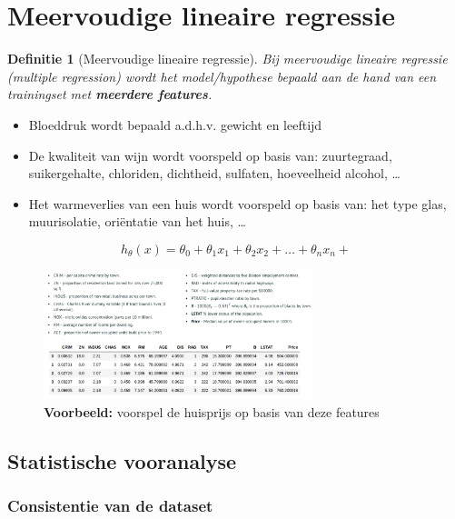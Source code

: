\documentclass{article}
\newtheorem{theorem}{Definitie}[section]
\begin{document}
\section{Meervoudige lineaire regressie}

\begin{theorem}[Meervoudige lineaire regressie]
Bij meervoudige lineaire regressie (multiple regression) wordt het model/hypothese bepaald 
aan de hand van een trainingset met \textbf{meerdere features}.
\end{theorem}

\begin{itemize}
    \item Bloeddruk wordt bepaald a.d.h.v. gewicht en leeftijd
    \item De kwaliteit van wijn wordt voorspeld op basis van: zuurtegraad, suikergehalte, chloriden, dichtheid, sulfaten, hoeveelheid alcohol, \dots
    \item Het warmeverlies van een huis wordt voorspeld op basis van: het type glas, muurisolatie, oriëntatie van het huis, \dots
\end{itemize}

\begin{equation}
h_{\theta}(x) = \theta_0 + \theta_1x_1 + \theta_2x_2 + \dots + \theta_nx_n + 
\end{equation}

\begin{figure}[H]
    \centering
    \includegraphics[width=0.7\textwidth]{multiple-regression-voorbeeld.png}
    \caption{\textbf{Voorbeeld:} voorspel de huisprijs op basis van deze features }
\end{figure}

\subsection{Statistische vooranalyse}

\subsubsection{Consistentie van de dataset}
\end{document}

